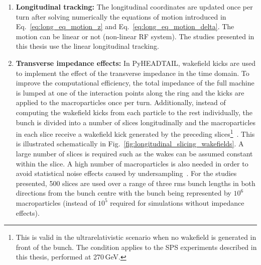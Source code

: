 {\begin{enumerate}
    \item \textbf{Longitudinal tracking:}  %
    The longitudinal coordinates are updated once per turn after solving numerically the equations of motion introduced in Eq.~\eqref{eq:long_eq_motion_z} and Eq.~\eqref{eq:long_eq_motion_delta}. The motion can be linear or not (non-linear RF system). The studies presented in this thesis use the linear longitudinal tracking.

    \item \textbf{Transverse impedance effects:} In PyHEADTAIL, wakefield kicks are used to implement the effect of the transverse impedance in the time domain. To improve the computational efficiency, the total impedance of the full machine is lumped at one of the interaction points along the ring and the kicks are applied to the macroparticles once per turn. Additionally, instead of computing the wakefield kicks from each particle to the rest individually, the bunch is divided into a number of slices longitudinally and the macroparticles in each slice receive a wakefield kick generated by the preceding slices\footnote{This is valid in the ultrarelativistic scenario when no wakefield is generated in front of the bunch. The condition applies to the SPS experiments described in this thesis, performed at 270\,GeV.}~\cite{Salvant:1274254}. This is illustrated schematically in Fig.~\ref{fig:longitudinal_slicing_wakefields}. A large number of slices is required such as the wakes can be assumed constant within the slice. A high number of macroparticles is also needed in order to avoid statistical noise effects caused by undersampling~\cite{pyheadtail_manual_adrian}. For the studies presented, 500 slices are used over a range of three rms bunch lengths in both directions from the bunch centre with the bunch being represented by $10^6$ macroparticles (instead of $10^5$ required for simulations without impedance effects).
    



\end{enumerate}}
